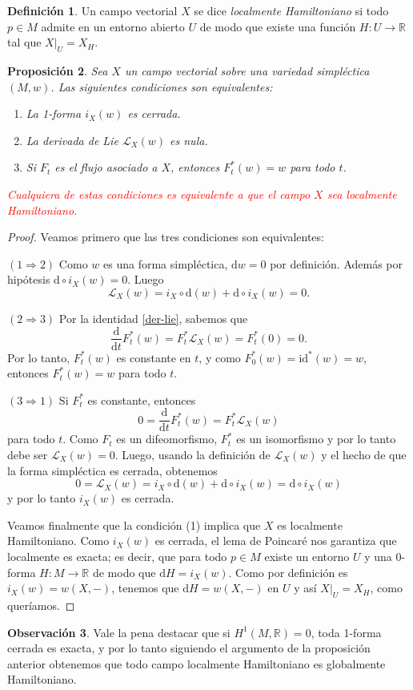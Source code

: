 \documentclass[11pt, a4paper]{article}
\newcommand{\RR}{\mathbb{R}}
\newcommand{\id}{\mathrm{id}}
\newcommand{\LL}{\mathcal{L}}
\theoremstyle{plain}
\newtheorem{prop}{Proposición}[section]
\theoremstyle{definition}
\newtheorem{defn}[prop]{Definición}
\newtheorem{obs}[prop]{Observación}
\begin{document}
\begin{defn} Un campo vectorial $X$ se dice \emph{localmente Hamiltoniano} si todo $p\in M$ admite en un entorno abierto $U$ de modo que existe una función $H:U\to \RR$ tal que $X|_U = X_H$.
\end{defn}
\begin{prop} Sea $X$ un campo vectorial sobre una variedad simpléctica $(M,w)$. Las siguientes condiciones son equivalentes:
\begin{enumerate}
\item La 1-forma $i_X(w)$ es cerrada.
\item La derivada de Lie $\LL_X(w)$ es nula.
\item Si $F_t$ es el flujo asociado a $X$, entonces $F_t^*(w)=w$ para todo $t$.
\end{enumerate}
\textcolor{red}{Cualquiera de estas condiciones es equivalente a que el campo $X$ sea localmente Hamiltoniano.}
\end{prop}
\begin{proof} Veamos primero que las tres condiciones son equivalentes:

$(1\Rightarrow 2)$ Como $w$ es una forma simpléctica, $\mathrm{d}w=0$ por definición. Además por hipótesis $\mathrm{d}\circ i_X(w)=0$. Luego
\[\LL_X(w)=i_X\circ\mathrm{d}(w)+\mathrm{d}\circ i_X(w)=0.\]

$(2\Rightarrow 3)$ Por la identidad \eqref{der-lie}, sabemos que
\[\frac{\mathrm{d}}{\mathrm{d}t}F_t^*(w) = F_t^*\LL_X(w)=F_t^*(0)=0.\]
Por lo tanto, $F_t^*(w)$ es constante en $t$, y como $F_0^*(w)=\id^*(w)=w$, entonces $F_t^*(w)=w$ para todo $t$.

$(3\Rightarrow 1)$ Si $F_t^*$ es constante, entonces
\[0=\frac{\mathrm{d}}{\mathrm{d}t}F_t^*(w) = F_t^*\LL_X(w)\]
para todo $t$. Como $F_t$ es un difeomorfismo, $F_t^*$ es un isomorfismo y por lo tanto debe ser $\LL_X(w)=0$. Luego, usando la definición de $\LL_X(w)$ y el hecho de que la forma simpléctica es cerrada, obtenemos
\[0=\LL_X(w)=i_X\circ\mathrm{d}(w)+\mathrm{d}\circ i_X(w) =\mathrm{d}\circ i_X(w)\]
y por lo tanto $i_X(w)$ es cerrada.

Veamos finalmente que la condición (1) implica que $X$ es localmente Hamiltoniano. Como $i_X(w)$ es cerrada, el lema de Poincaré nos garantiza que localmente es exacta; es decir, que para todo $p\in M$ existe un entorno $U$ y una $0$-forma $H:M\to \RR$ de modo que $\mathrm{d}H=i_X(w)$. Como por definición es $i_X(w)=w(X,-)$, tenemos que $\mathrm{d}H=w(X,-)$ en $U$ y así $X|_U=X_H$, como queríamos.
\end{proof}

\begin{obs} Vale la pena destacar que si $H^1(M,\RR)=0$, toda 1-forma cerrada es exacta, y por lo tanto siguiendo el argumento de la proposición anterior obtenemos que todo campo localmente Hamiltoniano es globalmente Hamiltoniano.
\end{obs}
\end{document}
